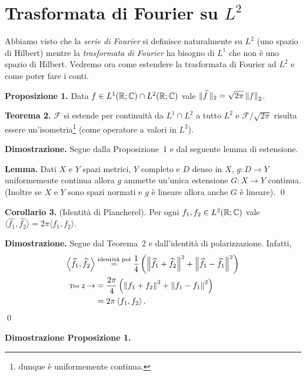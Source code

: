 
\section{Trasformata di Fourier su $L^2$}

Abbiamo visto che la \textit{serie di Fourier} si definisce naturalmente su $L^2$ (uno spazio di Hilbert) mentre la \textit{trasformata di Fourier} ha bisogno di $L^1$ che non è uno spazio di Hilbert. Vedremo ora come estendere la trasformata di Fourier ad $L^2$ e come poter fare i conti.

\textbf{Proposizione 1.}
Data $f \in L^1(\mathbb R; \mathbb C) \cap L^2(\mathbb R; \mathbb C)$ vale $\| \widehat f\, \|_2 = \sqrt{2\pi} \left\lVert f \right\rVert_2$.

\textbf{Teorema 2.}
$\mathcal F$ si estende per continuità da $L^1 \cap L^2$ a tutto $L^2$ e $\mathcal F / \sqrt{2\pi}$ risulta essere un'isometria\footnote{dunque è uniformemente continua.} (come operatore a valori in $L^2$).

\textbf{Dimostrazione.} Segue dalla Proposizione~1 e dal seguente lemma di estensione.

\textbf{Lemma.} Dati $X$ e $Y$ spazi metrici, $Y$ completo e $D$ denso in $X$, $g \colon D \to Y$ uniformemente continua allora $g$ ammette un'unica estensione $G \colon X \to Y$ continua. (Inoltre se $X$ e $Y$ sono spazi normati e $g$ è lineare allora anche $G$ è lineare).
\qed

\textbf{Corollario 3.} (Identità di Plancherel).
Per ogni $f_1, f_2 \in L^2(\mathbb R; \mathbb C)$ vale $\langle \hat{f_1}, \hat{f_2} \rangle = 2\pi \langle f_1, f_2 \rangle$.

\textbf{Dimostrazione.} Segue dal Teorema~2 e dall'identità di polarizzazione. 
Infatti, 
\begin{align*}
	\left<\widehat{f_1}, \widehat{f_2} \right>  & \overset{\text{identità pol}}{=} 
	\frac{1}{4} \left( \left\lVert \widehat{f_1} + \widehat{f_2} \right\rVert^2 + \left\lVert \widehat{f_1} - \widehat{f_1} \right\rVert^2 \right) \\
	\substack{\text{Teo~2}} \to & = \frac{2\pi}{4} \left( \left\lVert f_1 + f_2 \right\rVert^2 + \left\lVert f_1 - f_1 \right\rVert^2 \right) \\
	& = 2\pi \left<f_1,f_2 \right>.
\end{align*}
\qed

\vss

\textbf{Dimostrazione Proposizione 1.}

